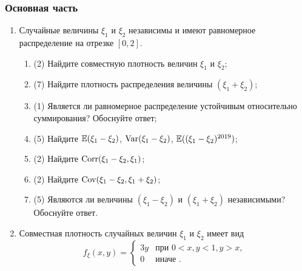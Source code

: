   \subsubsection*{Основная часть}
  
  \begin{enumerate}
  
  \item Случайные величины $\xi_1$ и $\xi_2$ независимы и имеют равномерное распределение на отрезке $[0, 2]$.
  
  \begin{enumerate}
  \item (2) Найдите
   совместную плотность величин $\xi_1$ и $\xi_2$;
  \item (7) Найдите
   плотность распределения величины $(\xi_1+\xi_2)$;
  \item (1) Является ли равномерное распределение устойчивым относительно суммирования? Обоснуйте ответ;
  \item (5) Найдите $\operatorname{\mathbb{E}}(\xi_1-\xi_2)$, $\operatorname{Var}(\xi_1-\xi_2)$, $\operatorname{\mathbb{E}}((\xi_1-\xi_2)^{2019})$;
  \item (2) Найдите $\operatorname{Corr}(\xi_1-\xi_2,\xi_1)$;
  \item (2) Найдите $\operatorname{Cov}(\xi_1-\xi_2,\xi_1+\xi_2)$;
  \item (5) Являются ли величины $(\xi_1-\xi_2)$ и $(\xi_1+\xi_2)$ независимыми? Обоснуйте ответ.
  
  \end{enumerate}
  
  \item Совместная плотность случайных величин 
  $\xi_1$ и $\xi_2$ имеет вид
  \[
  f_{\xi}(x,y) =      \begin{cases}
                       3y           &   \text{при } 0<x,y <1, y>x, \\
                       0     &   \text{иначе } .
                    \end{cases}
  \]
  

\end{enumerate}
